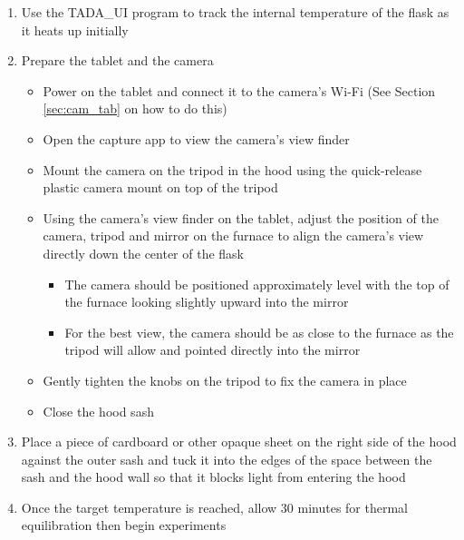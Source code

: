 \documentclass[letterpaper,11pt]{article}
\begin{document}
\begin{enumerate}
    \item Use the TADA\_UI program to track the internal temperature of the 
        flask as it heats up initially
    \item Prepare the tablet and the camera
        \begin{itemize}
        \item Power on the tablet and connect it to the camera's Wi-Fi (See 
            Section \ref{sec:cam_tab} on how to do this)
        \item Open the capture app to view the camera's view finder
        \item Mount the camera on the tripod in the hood using the quick-release
            plastic camera mount on top of the tripod
        \item Using the camera's view finder on the tablet, adjust the
            position of the camera, tripod and mirror on the furnace to 
            align the camera's view directly down the center of the flask
            \begin{itemize}
            \item The camera should be positioned approximately level with the 
                 top of the furnace looking slightly upward into the mirror
            \item For the best view, the camera should be as close to the 
                furnace as the tripod will allow and pointed directly into 
                the mirror
            \end{itemize}
        
        \item Gently tighten the knobs on the tripod to fix the camera in place
        \item Close the hood sash
        \end{itemize}
    
    \item Place a piece of cardboard or other opaque sheet on the right side 
        of the hood against the outer sash and tuck it into the edges of the 
        space between the sash and the hood wall so that it blocks light from 
        entering the hood
    \item Once the target temperature is reached, allow 30 minutes for thermal 
        equilibration then begin experiments
    \end{enumerate}
    
\end{document}
